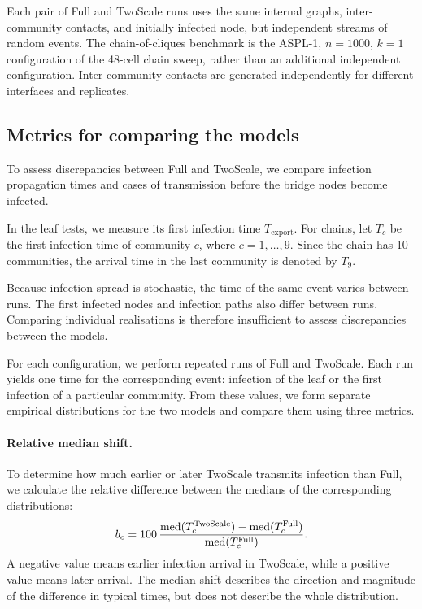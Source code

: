 \documentclass{ieeeaccess}
\newcommand{\michael}[2]{{\color{RoyalBlue}#1}}
\newcommand{\Full}{\textup{Full}}
\newcommand{\TS}{\textup{TwoScale}}
\begin{document}
\michael{Each pair of \Full{} and \TS{} runs uses the same internal graphs, inter-community contacts, and initially infected node, but independent streams of random events. The chain-of-cliques benchmark is the ASPL-1, $n=1000$, $k=1$ configuration of the 48-cell chain sweep, rather than an additional independent configuration.}{Each pair of \Full{} and \TS{} runs uses the same internal graphs, inter-community contacts, and initially infected node, but independent streams of random events.} Inter-community contacts are generated independently for different interfaces and replicates.

\subsection{Metrics for comparing the models}

To assess discrepancies between \Full{} and \TS{}, we compare infection propagation times and cases of transmission before the bridge nodes become infected.

In the leaf tests, we measure its first infection time $T_{\mathrm{export}}$. For chains, let $T_c$ be the first infection time of community $c$, where $c=1,\ldots,9$. Since the chain has 10 communities, the arrival time in the last community is denoted by $T_9$.

Because infection spread is stochastic, the time of the same event varies between runs. The first infected nodes and infection paths also differ between runs. Comparing individual realisations is therefore insufficient to assess discrepancies between the models.

For each configuration, we perform repeated runs of \Full{} and \TS{}. Each run yields one time for the corresponding event: infection of the leaf or the first infection of a particular community. From these values, we form separate empirical distributions for the two models and compare them using three metrics.

\paragraph{Relative median shift.}
To determine how much earlier or later \TS{} transmits infection than \Full{}, we calculate the relative difference between the medians of the corresponding distributions:
\[
b_c =
100\,
\frac{
\operatorname{med}(T_c^{\TS})-
\operatorname{med}(T_c^{\Full})
}{
\operatorname{med}(T_c^{\Full})
}.
\]
A negative value means earlier infection arrival in \TS{}, while a positive value means later arrival. The median shift describes the direction and magnitude of the difference in typical times, but does not describe the whole distribution.
\end{document}
